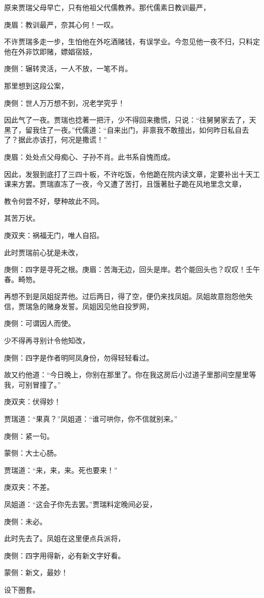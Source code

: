 \begin{parag}
    原来贾瑞父母早亡，只有他祖父代儒教养。那代儒素日教训最严，\begin{note}庚眉：教训最严，奈其心何！一叹。\end{note}不许贾瑞多走一步，生怕他在外吃酒赌钱，有误学业。今忽见他一夜不归，只料定他在外非饮即赌，嫖娼宿妓，\begin{note}庚侧：辗转灵活，一人不放，一笔不肖。\end{note}那里想到这段公案，\begin{note}庚侧：世人万万想不到，况老学究乎！\end{note}因此气了一夜。贾瑞也捻著一把汗，少不得回来撒慌，只说：“往舅舅家去了，天黑了，留我住了一夜。”代儒道：“自来出门，非禀我不敢擅出，如何昨日私自去了？据此亦该打，何况是撒谎！”\begin{note}庚眉：处处点父母痴心、子孙不肖。此书系自愧而成。\end{note}因此，发狠到底打了三四十板，不许吃饭，令他跪在院内读文章，定要补出十天工课来方罢。贾瑞直冻了一夜，今又遭了苦打，且饿著肚子跪在风地里念文章，\begin{note}教令何尝不好，孽种故此不同。\end{note}其苦万状。\begin{note}庚双夹：祸福无门，唯人自招。\end{note}
\end{parag}


\begin{parag}
    此时贾瑞前心犹是未改，\begin{note}庚侧：四字是寻死之根。庚眉：苦海无边，回头是岸。若个能回头也？叹叹！壬午春。畸笏。\end{note}再想不到是凤姐捉弄他。过后两日，得了空，便仍来找凤姐。凤姐故意抱怨他失信，贾瑞急的赌身发誓。凤姐因见他自投罗网，\begin{note}庚侧：可谓因人而使。\end{note}少不得再寻别计令他知改，\begin{note}庚侧：四字是作者明阿凤身份，勿得轻轻看过。\end{note}故又约他道：“今日晚上，你别在那里了。你在我这房后小过道子里那间空屋里等我，可别冒撞了。”\begin{note}庚双夹：伏得妙！\end{note}贾瑞道：“果真？”凤姐道：“谁可哄你，你不信就别来。”\begin{note}庚侧：紧一句。\end{note}\begin{note}蒙侧：大士心肠。\end{note}贾瑞道：“来，来，来。死也要来！”\begin{note}庚双夹：不差。\end{note}凤姐道：“这会子你先去罢。”贾瑞料定晚间必妥，\begin{note}庚侧：未必。\end{note}此时先去了。凤姐在这里便点兵派将，\begin{note}庚侧：四字用得新，必有新文字好看。\end{note}\begin{note}蒙侧：新文，最妙！\end{note}设下圈套。
\end{parag}


